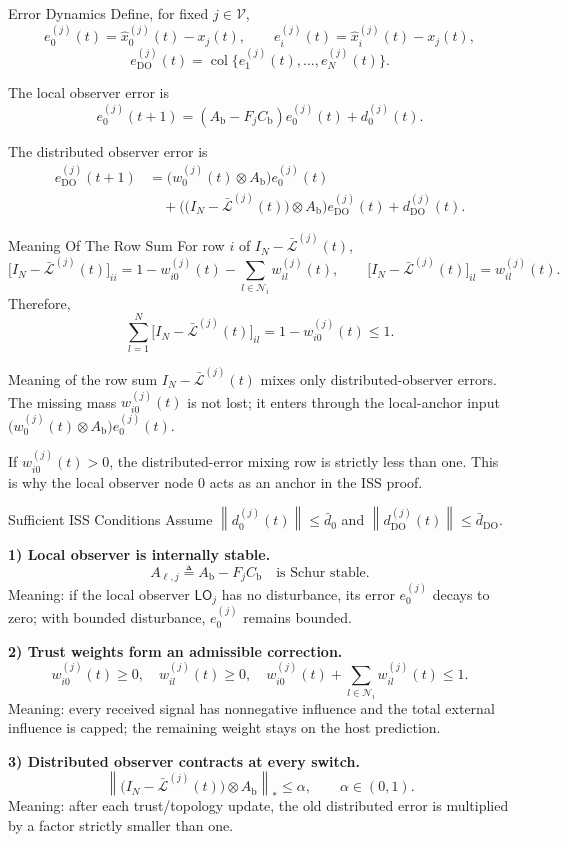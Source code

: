 \documentclass[aspectratio=169,10pt]{beamer}
\newcommand{\V}{\mathcal{V}}
\newcommand{\Lbar}{\bar{\mathcal{L}}}
\newcommand{\LO}{\mathsf{LO}}
\newcommand{\col}[1]{\operatorname{col}\{#1\}}
\newcommand{\norm}[1]{\left\lVert #1 \right\rVert}
\begin{document}
\begin{frame}{Error Dynamics}
\small
Define, for fixed $j\in\V$,
\[
e_0^{(j)}(t)=\hat{x}_0^{(j)}(t)-x_j(t),\qquad
e_i^{(j)}(t)=\hat{x}_i^{(j)}(t)-x_j(t),
\]
\[
e_{\mathrm{DO}}^{(j)}(t)=
\col{e_1^{(j)}(t),\ldots,e_N^{(j)}(t)}.
\]

The local observer error is
\[
e_0^{(j)}(t+1)=
\left(A_{\text{b}}-F_jC_{\text{b}}\right)e_0^{(j)}(t)+d_0^{(j)}(t).
\]

The distributed observer error is
\begin{align*}
e_{\mathrm{DO}}^{(j)}(t+1)
&=\Big(w_{0}^{(j)}(t)\otimes A_{\text{b}}\Big)e_0^{(j)}(t)\\
&\quad+
\Big(\big(I_{N}-\Lbar^{(j)}(t)\big)\otimes A_{\text{b}}\Big)
e_{\mathrm{DO}}^{(j)}(t)
+d_{\mathrm{DO}}^{(j)}(t).
\end{align*}
\end{frame}

\begin{frame}{Meaning Of The Row Sum}
\small
For row $i$ of $I_N-\Lbar^{(j)}(t)$,
\[
\big[I_N-\Lbar^{(j)}(t)\big]_{ii}
=1-w_{i0}^{(j)}(t)-\sum_{l\in\mathcal{N}_i}w_{il}^{(j)}(t),
\qquad
\big[I_N-\Lbar^{(j)}(t)\big]_{il}=w_{il}^{(j)}(t).
\]
Therefore,
\[
\sum_{l=1}^{N}\big[I_N-\Lbar^{(j)}(t)\big]_{il}
=1-w_{i0}^{(j)}(t)\le 1.
\]
\begin{block}{Meaning of the row sum}
$I_N-\Lbar^{(j)}(t)$ mixes only distributed-observer errors. The missing mass
$w_{i0}^{(j)}(t)$ is not lost; it enters through the local-anchor input
$\big(w_0^{(j)}(t)\otimes A_{\text{b}}\big)e_0^{(j)}(t)$.
\end{block}

If $w_{i0}^{(j)}(t)>0$, the distributed-error mixing row is strictly less than
one. This is why the local observer node $0$ acts as an anchor in the ISS proof.
\end{frame}

\begin{frame}{Sufficient ISS Conditions}
\footnotesize
Assume $\norm{d_0^{(j)}(t)}\le \bar d_0$ and
$\norm{d_{\mathrm{DO}}^{(j)}(t)}\le \bar d_{\mathrm{DO}}$.

\textbf{1) Local observer is internally stable.}
\[
A_{\ell,j}\triangleq A_{\text{b}}-F_jC_{\text{b}}
\quad\text{is Schur stable.}
\]
Meaning: if the local observer $\LO_j$ has no disturbance, its error
$e_0^{(j)}$ decays to zero; with bounded disturbance, $e_0^{(j)}$ remains bounded.

\vspace{1ex}
\textbf{2) Trust weights form an admissible correction.}
\[
w_{i0}^{(j)}(t)\ge0,\quad w_{il}^{(j)}(t)\ge0,\quad
w_{i0}^{(j)}(t)+\sum_{l\in\mathcal{N}_i}w_{il}^{(j)}(t)\le1.
\]
Meaning: every received signal has nonnegative influence and the total external
influence is capped; the remaining weight stays on the host prediction.

\vspace{1ex}
\textbf{3) Distributed observer contracts at every switch.}
\[
\left\|
\big(I_N-\Lbar^{(j)}(t)\big)\otimes A_{\text{b}}
\right\|_*
\le \alpha,\qquad \alpha\in(0,1).
\]
Meaning: after each trust/topology update, the old distributed error is multiplied
by a factor strictly smaller than one.
\end{frame}
\end{document}

